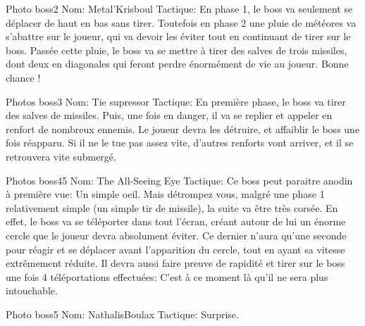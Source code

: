 Photo boss2   Nom: Metal'Krisboul
				Tactique: En phase 1, le boss va seulement se déplacer de haut en bas sans tirer. Toutefois en phase 2 une pluie de météores va s'abattre sur le joueur, qui va devoir les éviter tout en continuant de tirer sur le boss. Passée cette pluie, le boss va se mettre à tirer des salves de trois missiles, dont deux en diagonales qui feront perdre énormément de vie au joueur. Bonne chance !
				
Photos boss3  Nom: Tie supressor
				Tactique: En première phase, le boss va tirer des salves de missiles. Puis, une fois en danger, il va se replier et appeler en renfort de nombreux ennemis. Le joueur devra les détruire, et affaiblir le boss une fois réapparu. Si il ne le tue pas assez vite, d'autres renforts vont arriver, et il se retrouvera vite submergé.
				
Photos boss45 Nom: The All-Seeing Eye
				Tactique: Ce boss peut paraitre anodin à première vue: Un simple oeil. Mais détrompez vous, malgré une phase 1 relativement simple (un simple tir de missile), la suite va être très corsée. En effet, le boss va se téléporter dans tout l'écran, créant autour de lui un énorme cercle que le joueur devra absolument éviter. Ce dernier n'aura qu'une seconde pour réagir et se déplacer avant l'apparition du cercle, tout en ayant sa vitesse extrêmement réduite. Il devra aussi faire preuve de rapidité et tirer sur le boss une fois 4 téléportations effectuées: C'est à ce moment là qu'il ne sera plus intouchable.
				
Photo boss5   Nom: NathalisBoulax
				Tactique: Surprise.